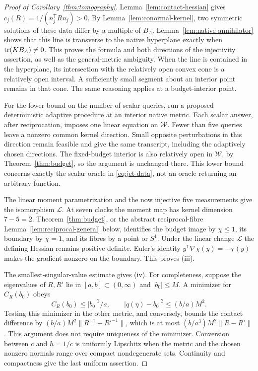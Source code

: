 \begin{proof}[Proof of Corollary~\ref{thm:tomography}]
Lemma~\ref{lem:contact-hessian} gives $c_j(R)=1/(n_j^{\mathsf T}Rn_j)>0$. By Lemma~\ref{lem:conormal-kernel}, two symmetric solutions of these data differ by a multiple of $B_A$. Lemma~\ref{lem:native-annihilator} shows that this line is transverse to the native hyperplane exactly when $\operatorname{tr}(KB_A)\ne0$. This proves the formula and both directions of the injectivity assertion, as well as the general-metric ambiguity. When the line is contained in the hyperplane, its intersection with the relatively open convex cone is a relatively open interval. A sufficiently small segment about an interior point remains in that cone. The same reasoning applies at a budget-interior point.

For the lower bound on the number of scalar queries, run a proposed deterministic adaptive procedure at an interior native metric. Each scalar answer, after reciprocation, imposes one linear equation on $\mathscr W$. Fewer than five queries leave a nonzero common kernel direction. Small opposite perturbations in this direction remain feasible and give the same transcript, including the adaptively chosen directions. The fixed-budget interior is also relatively open in $\mathscr W$, by Theorem~\ref{thm:budget}, so the argument is unchanged there. This lower bound concerns exactly the scalar oracle in \eqref{eq:jet-data}, not an oracle returning an arbitrary function.

The linear moment parametrization and the now injective five measurements give the isomorphism $\mathcal L$. At seven clocks the moment map has kernel dimension $7-5=2$. Theorem~\ref{thm:budget}, or the abstract reciprocal-fibre Lemma~\ref{lem:reciprocal-general} below, identifies the budget image by $\chi\le1$, its boundary by $\chi=1$, and its fibres by a point or $S^1$. Under the linear change $\mathcal L$ the defining Hessian remains positive definite. Euler's identity $y^{\mathsf T}\nabla\chi(y)=-\chi(y)$ makes the gradient nonzero on the boundary. This proves (iii).

The smallest-singular-value estimate gives (iv). For completeness, suppose the eigenvalues of $R,R'$ lie in $[a,b]\subset(0,\infty)$ and $|b_0|\le M$. A minimizer for $C_R(b_0)$ obeys
\[
 C_R(b_0)\le |b_0|^2/a,\qquad
 |q(\eta)-b_0|^2\le (b/a)M^2.
\]
Testing this minimizer in the other metric, and conversely, bounds the contact difference by $(b/a)M^2\|R^{-1}-R'^{-1}\|$, which is at most $(b/a^3)M^2\|R-R'\|$. This argument does not require uniqueness of the minimizer. Conversion between $c$ and $h=1/c$ is uniformly Lipschitz when the metric and the chosen nonzero normals range over compact nondegenerate sets. Continuity and compactness give the last uniform assertion.
\end{proof}

